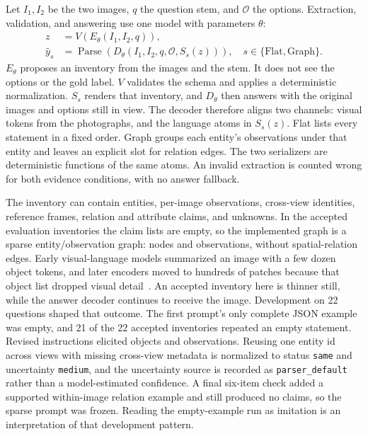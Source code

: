 Let $I_1,I_2$ be the two images, $q$ the question stem, and $\mathcal{O}$ the options. Extraction, validation, and answering use one model with parameters $\theta$:
\begin{equation}
\begin{aligned}
z &= V(E_\theta(I_1,I_2,q)),\\
\hat y_s &= \operatorname{Parse}(D_\theta(I_1,I_2,q,\mathcal{O},S_s(z))),
\quad s\in\{\mathrm{Flat},\mathrm{Graph}\}.
\end{aligned}
\label{eq:worldstate}
\end{equation}
$E_\theta$ proposes an inventory from the images and the stem. It does not see the options or the gold label. $V$ validates the schema and applies a deterministic normalization. $S_s$ renders that inventory, and $D_\theta$ then answers with the original images and options still in view. The decoder therefore aligns two channels: visual tokens from the photographs, and the language atoms in $S_s(z)$. Flat lists every statement in a fixed order. Graph groups each entity's observations under that entity and leaves an explicit slot for relation edges. The two serializers are deterministic functions of the same atoms. An invalid extraction is counted wrong for both evidence conditions, with no answer fallback.

The inventory can contain entities, per-image observations, cross-view identities, reference frames, relation and attribute claims, and unknowns. In the accepted evaluation inventories the claim lists are empty, so the implemented graph is a sparse entity/observation graph: nodes and observations, without spatial-relation edges. Early visual-language models summarized an image with a few dozen object tokens, and later encoders moved to hundreds of patches because that object list dropped visual detail~\citep{kim2021vilt}. An accepted inventory here is thinner still, while the answer decoder continues to receive the image. Development on 22 questions shaped that outcome. The first prompt's only complete JSON example was empty, and 21 of the 22 accepted inventories repeated an empty statement. Revised instructions elicited objects and observations. Reusing one entity id across views with missing cross-view metadata is normalized to status \texttt{same} and uncertainty \texttt{medium}, and the uncertainty source is recorded as \texttt{parser\_default} rather than a model-estimated confidence. A final six-item check added a supported within-image relation example and still produced no claims, so the sparse prompt was frozen. Reading the empty-example run as imitation is an interpretation of that development pattern.

